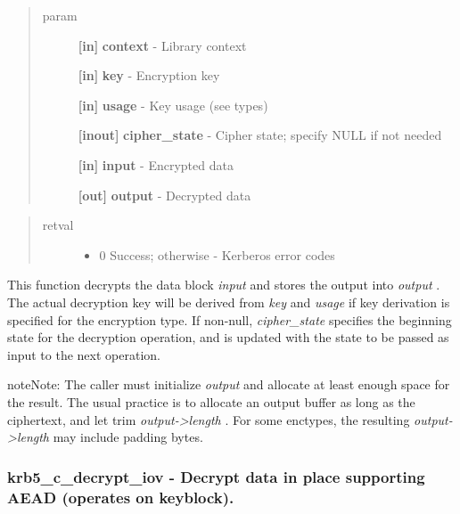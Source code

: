 \documentclass[letterpaper,10pt,english]{sphinxmanual}
\begin{document}
\begin{quote}\begin{description}
\item[{param}] \leavevmode
\textbf{{[}in{]}} \textbf{context} - Library context

\textbf{{[}in{]}} \textbf{key} - Encryption key

\textbf{{[}in{]}} \textbf{usage} - Key usage (see  types)

\textbf{{[}inout{]}} \textbf{cipher\_state} - Cipher state; specify NULL if not needed

\textbf{{[}in{]}} \textbf{input} - Encrypted data

\textbf{{[}out{]}} \textbf{output} - Decrypted data

\end{description}\end{quote}
\begin{quote}\begin{description}
\item[{retval}] \leavevmode\begin{itemize}
\item {} 
0   Success; otherwise - Kerberos error codes

\end{itemize}

\end{description}\end{quote}

This function decrypts the data block \emph{input} and stores the output into \emph{output} . The actual decryption key will be derived from \emph{key} and \emph{usage} if key derivation is specified for the encryption type. If non-null, \emph{cipher\_state} specifies the beginning state for the decryption operation, and is updated with the state to be passed as input to the next operation.

\begin{notice}{note}{Note:}
The caller must initialize \emph{output} and allocate at least enough space for the result. The usual practice is to allocate an output buffer as long as the ciphertext, and let {\hyperref[appdev/refs/api/krb5_c_decrypt:c.krb5_c_decrypt]{}} trim \emph{output-\textgreater{}length} . For some enctypes, the resulting \emph{output-\textgreater{}length} may include padding bytes.
\end{notice}


\subsubsection{krb5\_c\_decrypt\_iov -  Decrypt data in place supporting AEAD (operates on keyblock).}
\label{appdev/refs/api/krb5_c_decrypt_iov:krb5-c-decrypt-iov-decrypt-data-in-place-supporting-aead-operates-on-keyblock}\label{appdev/refs/api/krb5_c_decrypt_iov::doc}
\end{document}
